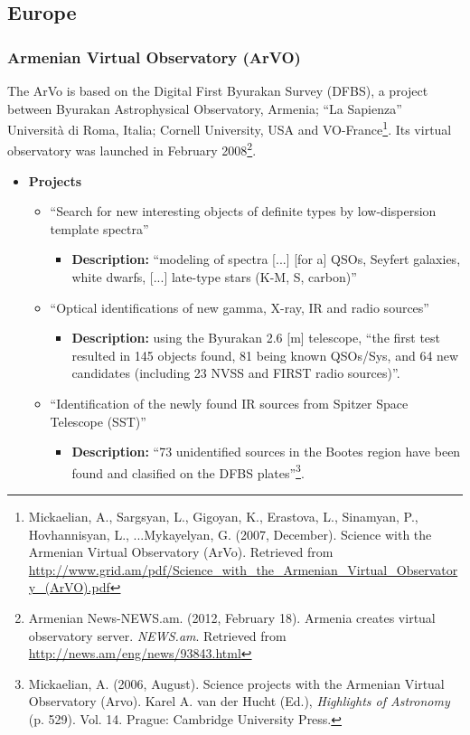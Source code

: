 \subsection{Europe}
\subsubsection{Armenian Virtual Observatory (ArVO)}
The ArVo \cite{website:arvo-home} is based on the Digital First Byurakan Survey
(DFBS), a project between Byurakan Astrophysical Observatory, Armenia; ``La
Sapienza'' Universit\`{a} di Roma, Italia; Cornell University, USA and
VO-France\footnote{Mickaelian, A., Sargsyan, L., Gigoyan, K., Erastova, L.,
Sinamyan, P., Hovhannisyan, L., ...Mykayelyan, G. (2007, December). Science with
the Armenian Virtual Observatory (ArVo).  Retrieved from
\url{http://www.grid.am/pdf/Science_with_the_Armenian_Virtual_Observatory_(ArVO).pdf}}.
Its virtual observatory was launched in February 2008\footnote{Armenian
News-NEWS.am. (2012, February 18). Armenia creates virtual observatory server.
\textit{NEWS.am}. Retrieved from \url{http://news.am/eng/news/93843.html}}.

\begin{itemize}
\item \textbf{Projects}
\begin{itemize}
\item ``Search for new interesting objects of definite types by low-dispersion
template spectra'' 
\begin{itemize}
\item \textbf{Description:} ``modeling of spectra [...] [for a] QSOs, Seyfert
galaxies, white dwarfs, [...] late-type stars (K-M, S, carbon)'' 
\end{itemize}
\end{itemize}
\begin{itemize}
\item ``Optical identifications of new gamma, X-ray, IR and radio sources''
\begin{itemize}
\item \textbf{Description:} using the Byurakan 2.6 [m] telescope, ``the first
test resulted in 145 objects found, 81 being known QSOs/Sys, and 64 new
candidates (including 23 NVSS and FIRST radio sources)''.
\end{itemize}
\end{itemize}
\begin{itemize}
\item ``Identification of the newly found IR sources from Spitzer Space
Telescope (SST)''
\begin{itemize}
\item \textbf{Description:} ``73 unidentified sources in the Bootes region have
been found and clasified on the DFBS plates''\footnote{Mickaelian, A. (2006,
August). Science projects with the Armenian Virtual Observatory (Arvo). Karel A.
van der Hucht (Ed.), \textit{Highlights of Astronomy} (p. 529). Vol. 14. Prague:
Cambridge University
Press. }.
\end{itemize}
\end{itemize}
\end{itemize}

